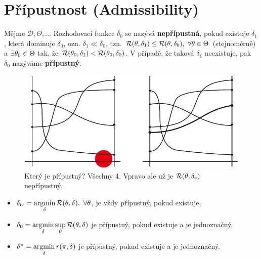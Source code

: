 \section{Přípustnost (Admissibility)}
\begin{define}
	Mějme $\mathscr{D},\Theta,...$ Rozhodovací funkce $\delta_0$ se nazývá \textbf{nepřípustná}, pokud existuje $\delta_1$, která dominuje $\delta_0$, ozn. $\delta_1\ll\delta_0$, tzn. $\mathcal{R}(\theta,\delta_1)\leq\mathcal{R}(\theta,\delta_0),~\forall\theta\in\Theta$ (stejnoměrně) a $\exists\theta_0\in\Theta$ tak, že $\mathcal{R}(\theta_0,\delta_1)<\mathcal{R}(\theta_0,\delta_0)$. V případě, že taková $\delta_1$ neexistuje, pak $\delta_0$ nazýváme \textbf{přípustný}.
	
	\begin{figure}[h]
		\centering
		\includegraphics[width=0.6\linewidth]{pictures/9_2-3.pdf}
		\caption{Který je přípustný? Všechny 4. Vpravo ale už je $\mathcal{R}(\theta,\delta_\circ)$ nepřípustný.}
		\label{fig:92}
	\end{figure}
	\FloatBarrier
	
\end{define}
\begin{theorem}\label{veta_pripustna}
	\begin{itemize}
	\item  $\delta_U=\mathop{\mathrm{argmin}}\limits_\delta\mathcal{R}(\theta,\delta),~\forall\theta$, je vždy přípustný, pokud existuje, \item  $\delta_0=\mathop{\mathrm{argmin}}\limits_\delta\sup\limits_\theta\mathcal{R}(\theta,\delta)$ je přípustný, pokud existuje a je jednoznačný, \item  $\delta^\pi=\mathop{\mathrm{argmin}}\limits_\delta r(\pi,\delta)$ je přípustný, pokud existuje a je jednoznačný.
\end{itemize}
\end{theorem}



